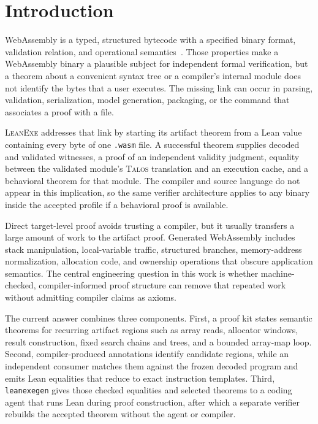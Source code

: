 \documentclass[11pt]{article}
\newcommand{\leanexe}{\textsc{LeanExe}}
\newcommand{\leanexegen}{\texttt{leanexegen}}
\newcommand{\talos}{\textsc{Talos}}
\newcommand{\code}[1]{\texttt{#1}}
\begin{document}
\section{Introduction}

WebAssembly is a typed, structured bytecode with a specified binary format, validation relation, and operational semantics~\cite{Haas2017WebAssembly,WasmCore30}.  Those properties make a WebAssembly binary a plausible subject for independent formal verification, but a theorem about a convenient syntax tree or a compiler's internal module does not identify the bytes that a user executes.  The missing link can occur in parsing, validation, serialization, model generation, packaging, or the command that associates a proof with a file.

\leanexe{} addresses that link by starting its artifact theorem from a Lean value containing every byte of one \code{.wasm} file.  A successful theorem supplies decoded and validated witnesses, a proof of an independent validity judgment, equality between the validated module's \talos{} translation and an execution cache, and a behavioral theorem for that module.  The compiler and source language do not appear in this implication, so the same verifier architecture applies to any binary inside the accepted profile if a behavioral proof is available.

Direct target-level proof avoids trusting a compiler, but it usually transfers a large amount of work to the artifact proof.  Generated WebAssembly includes stack manipulation, local-variable traffic, structured branches, memory-address normalization, allocation code, and ownership operations that obscure application semantics.  The central engineering question in this work is whether machine-checked, compiler-informed proof structure can remove that repeated work without admitting compiler claims as axioms.

The current answer combines three components.  First, a proof kit states semantic theorems for recurring artifact regions such as array reads, allocator windows, result construction, fixed search chains and trees, and a bounded array-map loop.  Second, compiler-produced annotations identify candidate regions, while an independent consumer matches them against the frozen decoded program and emits Lean equalities that reduce to exact instruction templates.  Third, \leanexegen{} gives those checked equalities and selected theorems to a coding agent that runs Lean during proof construction, after which a separate verifier rebuilds the accepted theorem without the agent or compiler.
\end{document}
